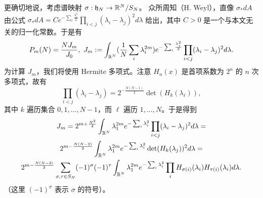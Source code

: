 更确切地说，考虑谱映射 $\sigma: {\frak h}_N\to \Bbb R^N/S_N$。
众所周知（H. Weyl），直像
$\sigma_*dA$ 由公式
$\sigma_*dA=Ce^{-\sum_i\frac{\lambda_i^2}{2}}\prod_{i<j} (\lambda_i-\lambda_j)^2d\lambda$ 
给出，其中 $C>0$ 是一个与本文无关的归一化常数。于是有
$$
P_m(N)=\frac{NJ_m}{J_0},\ J_m:=\int_{\Bbb R^N}(\frac{1}{N}\sum_i\lambda_i^{2m})
e^{-\sum_i \frac{\lambda_i^2}{2}}\prod_{i<j} (\lambda_i-\lambda_j)^2d\lambda.
$$
为计算 $J_m$，我们将使用 Hermite 多项式。注意 $H_n(x)$ 是首项系数为 $2^n$ 的 $n$ 次多项式，故有
$$
\prod_{i<j}(\lambda_i-\lambda_j)= 2^{-\frac{N(N-1)}{2}}
\det (H_k(\lambda_\ell)),
$$ 
其中 $k$ 遍历集合
$0,1, \ldots ,N-1$，而 $\ell$ 遍历 $1,...,N$。于是得到
\begin{equation}
\begin{gathered}
J_m=2^{m+{N^2\over 2}}\int_{\Bbb R^N}\lambda_1^{2m}
e^{-\sum_i \lambda_i^2}\prod_{i<j} (\lambda_i-\lambda_j)^2d\lambda=\\ 
2^{m-{N(N-2)\over 2}}\int_{\Bbb R^N}\lambda_1^{2m}
e^{-\sum_i \lambda_i^2}\det(H_k(\lambda_j))^2d\lambda=\\ 
2^{m-{N(N-2)\over 2}}\sum_{\sigma,\tau\in S_N}(-1)^{\sigma}(-1)^{\tau}\int_{\Bbb R^N}\lambda_1^{2m}
e^{-\sum_i \lambda_i^2}
\prod_i H_{\sigma(i)}(\lambda_i)H_{\tau(i)}(\lambda_i)d\lambda.
\end{gathered}
\end{equation}
（这里 $(-1)^\sigma$ 表示 $\sigma$ 的符号）。

